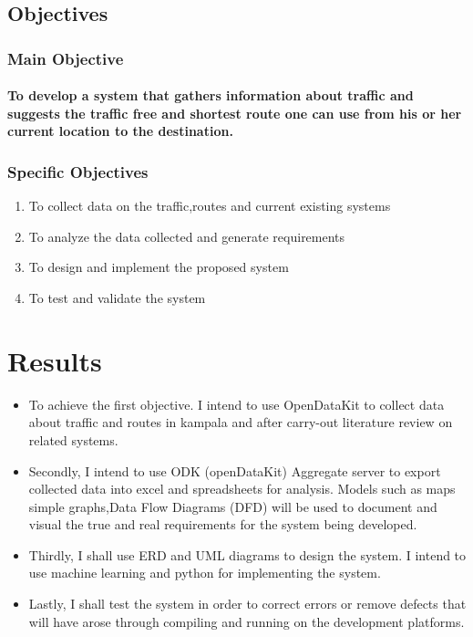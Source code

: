 \documentclass[11pt]{article}
\begin{document}
	 \subsection{\textbf{Objectives}}
	 \subsubsection{\textbf{Main Objective}}
	  
	  \paragraph{\textmd{To develop a system that gathers information about traffic and suggests the traffic free and shortest route one can use from his or her current location to the destination.}}
	  	
	   \subsubsection{\textbf{Specific Objectives}}
	   
	   \begin{enumerate}
	   
	   \item To collect data on the traffic,routes and current existing systems
	   \item To analyze the data collected and generate requirements
	   \item To design and implement the proposed system 
	   \item To test and validate the system
	           
	   \end{enumerate} 	  
 \section{\textbf{Results}}
 \begin{itemize}
 	\item	To achieve the first objective. I intend to use OpenDataKit to collect data about traffic and routes in kampala and after carry-out literature review on related systems.
 	\item	Secondly, I intend to use ODK (openDataKit) Aggregate server to export collected data into excel and spreadsheets for analysis. Models such as maps simple graphs,Data Flow Diagrams (DFD) will be used to document and visual the true and real requirements for the system being developed.
 	\item	Thirdly, I shall use ERD and UML diagrams to design the system. I intend to use machine learning and python for implementing the system.
 	\item	Lastly, I shall test the system in order to correct errors or remove defects that will have arose through compiling and running on the development platforms.
 \end{itemize}
    	
    	 
       
\end{document}
